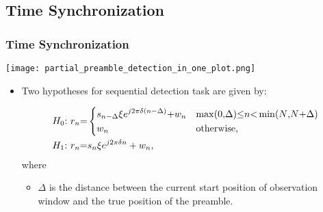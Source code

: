 \subsection{Time Synchronization}

\begin{frame}
    \frametitle{Time Synchronization}

    \begin{center}
      \texttt{[image: partial\_preamble\_detection\_in\_one\_plot.png]}
    \end{center}

    \begin{itemize}
      \item Two hypotheses for sequential detection task are given by:
      
      \begin{equation*}
        \label{eq:two hypotheses}
        \begin{aligned}
        &H_0{:}~r_n{=}
        \begin{dcases}
            s_{n-\Delta}\xi e^{j2\pi\delta (n-\Delta)}{+}w_n & \max(0{,}\Delta){\leq} n {<} \min(N{,}N{+}\Delta) \\
            w_n & \text{otherwise},
        \end{dcases} \\
        &H_1{:}~r_n{=}s_n\xi e^{j2\pi\delta n}+w_n,
        \end{aligned}
      \end{equation*}
      where
      
      \begin{itemize}
          \item $\Delta$ is the distance between the current start position of observation window and the true position of the preamble.
      \end{itemize}

    \end{itemize} 

\end{frame}


